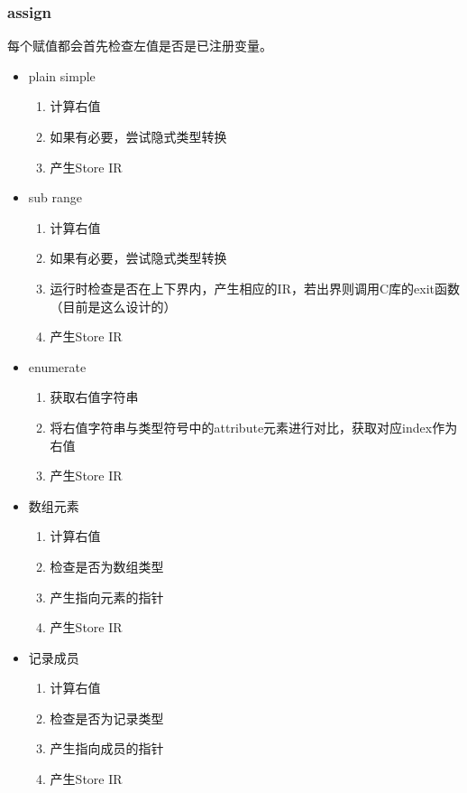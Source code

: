 \documentclass{article}
\begin{document}
\subsubsection{assign}
\par 每个赋值都会首先检查左值是否是已注册变量。
\begin{itemize}
  \item plain simple
  \begin{enumerate}
    \item 计算右值
    \item 如果有必要，尝试隐式类型转换
    \item 产生Store IR
  \end{enumerate}
  \item sub range
  \begin{enumerate}
    \item 计算右值
    \item 如果有必要，尝试隐式类型转换
    \item 运行时检查是否在上下界内，产生相应的IR，若出界则调用C库的exit函数（目前是这么设计的）
    \item 产生Store IR
  \end{enumerate}
  \item enumerate
  \begin{enumerate}
    \item 获取右值字符串
    \item 将右值字符串与类型符号中的attribute元素进行对比，获取对应index作为右值
    \item 产生Store IR
  \end{enumerate}
  \item 数组元素
  \begin{enumerate}
    \item 计算右值
    \item 检查是否为数组类型
    \item 产生指向元素的指针
    \item 产生Store IR
  \end{enumerate}
  \item 记录成员
  \begin{enumerate}
    \item 计算右值
    \item 检查是否为记录类型
    \item 产生指向成员的指针
    \item 产生Store IR
  \end{enumerate}
\end{itemize}
\end{document}
